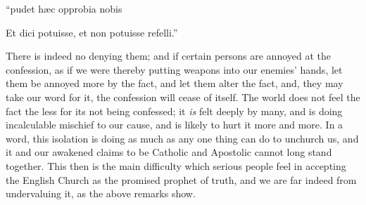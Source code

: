``pudet hæc opprobia nobis

Et dici potuisse, et non potuisse refelli.''

There is indeed no denying them; and if certain persons are annoyed
at the confession, as if we were thereby putting weapons into our
enemies' hands, let them be annoyed more by the fact, and let them
alter the fact, and, they may take our word for it, the confession
will cease of itself. The world does not feel the fact the less for
its not being confessed; it \emph{is} felt deeply by many, and is doing
incalculable mischief to our cause, and is likely to hurt it more and
more. In a word, this isolation is doing as much as any one thing can
do to unchurch us, and it and our awakened claims to be Catholic and
Apostolic cannot long stand together. This then is the main difficulty
which serious people feel in accepting the English Church as the
promised prophet of truth, and we are far indeed from undervaluing it,
as the above remarks show.

